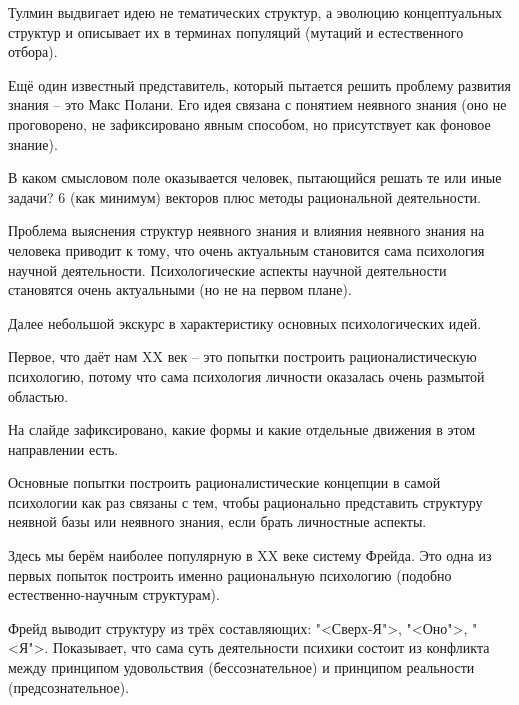 \documentclass[main.tex]{subfiles}
\begin{document}

Тулмин выдвигает идею не тематических структур, а эволюцию концептуальных структур и описывает их в терминах популяций (мутаций и естественного отбора).



Ещё один известный представитель, который пытается решить проблему развития знания -- это Макс Полани.
Его идея связана с понятием неявного знания (оно не проговорено, не зафиксировано явным способом, но присутствует как фоновое знание).


В каком смысловом поле оказывается человек, пытающийся решать те или иные задачи?
6 (как минимум) векторов плюс методы рациональной деятельности.

Проблема выяснения структур неявного знания и влияния неявного знания на человека приводит к тому, что очень актуальным становится сама психология научной деятельности.
Психологические аспекты научной деятельности становятся очень актуальными (но не на первом плане).



Далее небольшой экскурс в характеристику основных психологических идей.

Первое, что даёт нам XX век -- это попытки построить рационалистическую психологию, потому что сама психология личности оказалась очень размытой областью.

На слайде зафиксировано, какие формы и какие отдельные движения в этом направлении есть.


Основные попытки построить рационалистические концепции в самой психологии как раз связаны с тем, чтобы рационально представить структуру неявной базы или неявного знания, если брать личностные аспекты.

Здесь мы берём наиболее популярную в XX веке систему Фрейда.
Это одна из первых попыток построить именно рациональную психологию (подобно естественно-научным структурам).

Фрейд выводит структуру из трёх составляющих: "<Сверх-Я">, "<Оно">, "<Я">.
Показывает, что сама суть деятельности психики состоит из конфликта между принципом удовольствия (бессознательное) и принципом реальности (предсознательное).
\end{document}

